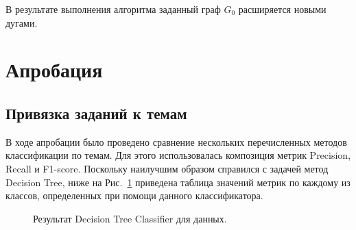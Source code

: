 \documentclass[14pt]{matmex-diploma-custom}
\begin{document}
В результате выполнения алгоритма заданный граф $G_0$ расширяется новыми дугами. %

\section{Апробация}

\subsection{Привязка заданий к темам}
В ходе апробации было проведено сравнение нескольких перечисленных методов классификации по темам. Для этого использовалась композиция метрик Precision, Recall и F1-score. Поскольку наилучшим образом справился с задачей метод Decision Tree, ниже на Рис.~\ref{report} приведена таблица значений метрик по каждому из классов, определенных при помощи данного классификатора.

\begin{figure}
\caption{Результат Decision Tree Classifier для данных.}
\label{report}
\end{figure}
\end{document}
